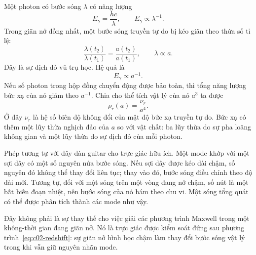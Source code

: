 Một photon có bước sóng \(\lambda\) có năng lượng
\begin{equation}
E_\gamma=\frac{hc}{\lambda},
\qquad
E_\gamma\propto\lambda^{-1}.
\label{eq:c02-photon-energy}
\end{equation}
Trong giãn nở đồng nhất, một bước sóng truyền tự do bị kéo giãn theo thừa số tỉ lệ:
\begin{equation}
\frac{\lambda(t_2)}{\lambda(t_1)}
=\frac{a(t_2)}{a(t_1)},
\qquad
\lambda\propto a.
\label{eq:c02-redshift}
\end{equation}
Đây là sự dịch đỏ vũ trụ học. Hệ quả là
\begin{equation}
E_\gamma\propto a^{-1}.
\label{eq:c02-photon-redshift}
\end{equation}
Nếu số photon trong hộp đồng chuyển động được bảo toàn, thì tổng năng lượng bức xạ của nó giảm theo \(a^{-1}\). Chia cho thể tích vật lý của nó \(a^3\) ta được
\begin{equation}
\boxed{\rho_r(a)=\frac{\nu_r}{a^4}.}
\label{eq:c02-radiation-density}
\end{equation}
Ở đây \(\nu_r\) là hệ số biên độ không đổi của mật độ bức xạ truyền tự do. Bức xạ có thêm một lũy thừa nghịch đảo của \(a\) so với vật chất: ba lũy thừa do sự pha loãng không gian và một lũy thừa do sự dịch đỏ của mỗi photon.

Phép tương tự với dây đàn guitar cho trực giác hữu ích. Một mode khớp với một sợi dây có một số nguyên nửa bước sóng. Nếu sợi dây được kéo dài chậm, số nguyên đó không thể thay đổi liên tục; thay vào đó, bước sóng điều chỉnh theo độ dài mới. Tương tự, đối với một sóng trên một vòng đang nở chậm, số nút là một bất biến đoạn nhiệt, nên bước sóng của nó bám theo chu vi. Một sóng tổng quát có thể được phân tích thành các mode như vậy.

Đây không phải là sự thay thế cho việc giải các phương trình Maxwell trong một không-thời gian đang giãn nở. Nó là trực giác được kiểm soát đứng sau phương trình~\eqref{eq:c02-redshift}: sự giãn nở hình học chậm làm thay đổi bước sóng vật lý trong khi vẫn giữ nguyên nhãn mode.

\begin{classroomqa}
\end{classroomqa}

